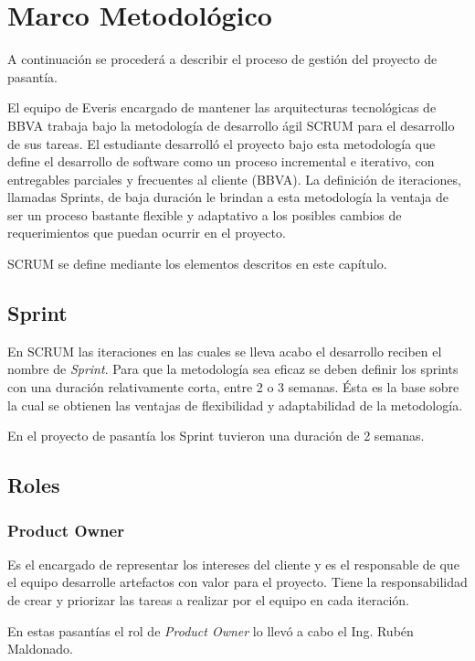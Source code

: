 \chapter{Marco Metodológico}
\label{capitulo4}

A continuación se procederá a describir el proceso de gestión
del proyecto de pasantía.

El equipo de Everis encargado de mantener las arquitecturas tecnológicas
de BBVA trabaja bajo la metodología de desarrollo ágil SCRUM para el
desarrollo de sus tareas. El estudiante desarrolló el proyecto bajo
esta metodología que define el desarrollo de software como un proceso
incremental e iterativo, con entregables parciales y frecuentes al
cliente (BBVA). La definición de iteraciones, llamadas Sprints, de baja duración
le brindan a esta metodología la ventaja de ser un proceso bastante flexible y
adaptativo a los posibles cambios de requerimientos que puedan ocurrir en el proyecto.

SCRUM se define mediante los elementos descritos en este capítulo.

\section{Sprint}
En SCRUM las iteraciones en las cuales se lleva acabo el desarrollo reciben el nombre
de \emph{Sprint}. Para que la metodología sea eficaz se deben definir los sprints con
una duración relativamente corta, entre 2 o 3 semanas. Ésta es la base sobre la cual
se obtienen las ventajas de flexibilidad y adaptabilidad de la metodología.

En el proyecto de pasantía los Sprint tuvieron una duración de 2 semanas.

\section{Roles}

\subsection{Product Owner}
Es el encargado de representar los intereses del cliente y es el responsable de
que el equipo desarrolle artefactos con valor para el proyecto. Tiene la responsabilidad
de crear y priorizar las tareas a realizar por el equipo en cada iteración.

En estas pasantías el rol de \emph{Product Owner} lo llevó a cabo el Ing. Rubén
Maldonado.

